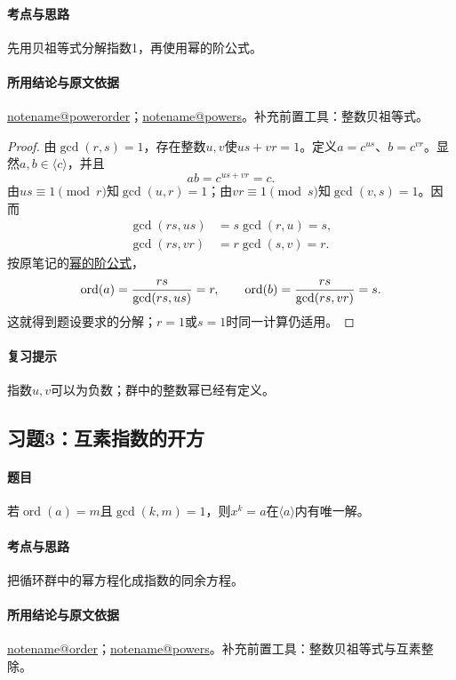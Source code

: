 \documentclass[UTF8,a4paper,11pt,fontset=windows]{ctexart}
\makeatletter
\newcommand{\noteref}[1]{\hyperref[note:#1]{\csname notename@#1\endcsname}}
\newcommand{\proofref}[2]{\hyperref[note:#1]{#2}}
\newcommand{\exref}[2]{\hyperref[ex:#1:#2]{第#1章习题#2}}
\makeatother
\begin{document}
\paragraph{考点与思路}
先用贝祖等式分解指数1，再使用幂的阶公式。

\paragraph{所用结论与原文依据}
\noteref{powerorder}；\noteref{powers}。补充前置工具：整数贝祖等式。


\begin{proof}
由$\gcd(r,s)=1$，存在整数$u,v$使$us+vr=1$。定义$a=c^{us}$、$b=c^{vr}$。显然$a,b\in\langle c\rangle$，并且
\[
ab=c^{us+vr}=c.
\]
由$us\equiv1\pmod r$知$\gcd(u,r)=1$；由$vr\equiv1\pmod s$知$\gcd(v,s)=1$。因而
\begin{align*}
\gcd(rs,us)&=s\gcd(r,u)=s,\\
\gcd(rs,vr)&=r\gcd(s,v)=r.
\end{align*}
按原笔记的\proofref{powerorder}{幂的阶公式}，
\[
\operatorname{ord}(a)=\frac{rs}{\gcd(rs,us)}=r,\qquad
\operatorname{ord}(b)=\frac{rs}{\gcd(rs,vr)}=s.
\]
这就得到题设要求的分解；$r=1$或$s=1$时同一计算仍适用。
\end{proof}

\paragraph{复习提示}
指数$u,v$可以为负数；群中的整数幂已经有定义。


\subsection{习题3：\texorpdfstring{互素指数的开方}{互素指数的开方}}
\label{ex:2:3}

\paragraph{题目}
若$\operatorname{ord}(a)=m$且$\gcd(k,m)=1$，则$x^k=a$在$\langle a\rangle$内有唯一解。

\paragraph{考点与思路}
把循环群中的幂方程化成指数的同余方程。

\paragraph{所用结论与原文依据}
\noteref{order}；\noteref{powers}。补充前置工具：整数贝祖等式与互素整除。
\end{document}
